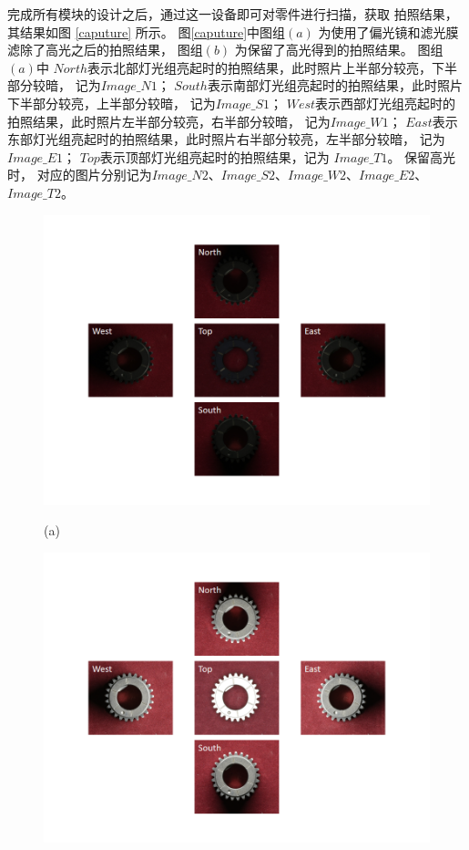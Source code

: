 完成所有模块的设计之后，通过这一设备即可对零件进行扫描，获取
拍照结果，其结果如图
\ref{caputure}
所示。
图\ref{caputure}中图组$(a)$
为使用了偏光镜和滤光膜滤除了高光之后的拍照结果，
图组$(b)$
为保留了高光得到的拍照结果。
图组$(a)$中
$North$表示北部灯光组亮起时的拍照结果，此时照片上半部分较亮，下半部分较暗，
记为$Image\_N1$；
$South$表示南部灯光组亮起时的拍照结果，此时照片下半部分较亮，上半部分较暗，
记为$Image\_S1$；
$West$表示西部灯光组亮起时的拍照结果，此时照片左半部分较亮，右半部分较暗，
记为$Image\_W1$；
$East$表示东部灯光组亮起时的拍照结果，此时照片右半部分较亮，左半部分较暗，
记为$Image\_E1$；
$Top$表示顶部灯光组亮起时的拍照结果，记为
$Image\_T1$。
保留高光时，
对应的图片分别记为$Image\_N2$、$Image\_S2$、$Image\_W2$、$Image\_E2$、$Image\_T2$。

\begin{figure}[htbp]
\centering
	\begin{minipage}[]{1.0\linewidth}
	\centerline{\includegraphics[width=1\linewidth]{figures/capturea.png}}
	\centerline{
		\footnotesize{(a)}}
	\label{caputurea}
	\end{minipage}
	\begin{minipage}[]{1.0\linewidth}
	\vspace{-1pt}
	\centerline{\includegraphics[width=1\linewidth]{figures/captureb.png}}

\end{minipage}
\end{figure}
